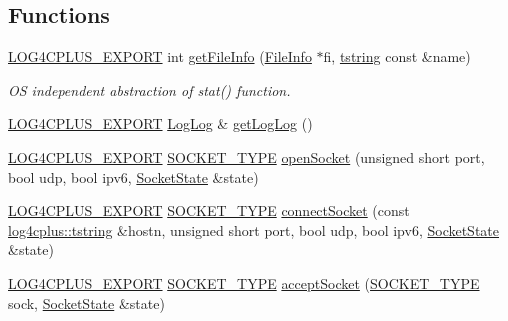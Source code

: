\subsection*{Functions}
\begin{DoxyCompactItemize}
\item 
\hyperlink{config_8hxx_ab13cb1a5317c245ee2ef4f2bfe0cfb2d}{L\-O\-G4\-C\-P\-L\-U\-S\-\_\-\-E\-X\-P\-O\-R\-T} int \hyperlink{namespacelog4cplus_1_1helpers_a4925e40c10820c28b753796a20a0b25e}{get\-File\-Info} (\hyperlink{structlog4cplus_1_1helpers_1_1FileInfo}{File\-Info} $\ast$fi, \hyperlink{namespacelog4cplus_a3c9287f6ebcddc50355e29d71152117b}{tstring} const \&name)
\begin{DoxyCompactList}\small\item\em O\-S independent abstraction of {\ttfamily stat()} function. \end{DoxyCompactList}\item 
\hyperlink{config_8hxx_ab13cb1a5317c245ee2ef4f2bfe0cfb2d}{L\-O\-G4\-C\-P\-L\-U\-S\-\_\-\-E\-X\-P\-O\-R\-T} \hyperlink{classlog4cplus_1_1helpers_1_1LogLog}{Log\-Log} \& \hyperlink{namespacelog4cplus_1_1helpers_ad330eb60c67283631cd16a0b45c9bfd9}{get\-Log\-Log} ()
\item 
\hyperlink{config_8hxx_ab13cb1a5317c245ee2ef4f2bfe0cfb2d}{L\-O\-G4\-C\-P\-L\-U\-S\-\_\-\-E\-X\-P\-O\-R\-T} \hyperlink{namespacelog4cplus_1_1helpers_afe2a1567866b6a9e0bfd5d425c3323f2}{S\-O\-C\-K\-E\-T\-\_\-\-T\-Y\-P\-E} \hyperlink{namespacelog4cplus_1_1helpers_ae1a347e14ce1f2daadf2817a1b7bed1f}{open\-Socket} (unsigned short port, bool udp, bool ipv6, \hyperlink{namespacelog4cplus_1_1helpers_ac57a089674b66ea982e43dff7ff1c78e}{Socket\-State} \&state)
\item 
\hyperlink{config_8hxx_ab13cb1a5317c245ee2ef4f2bfe0cfb2d}{L\-O\-G4\-C\-P\-L\-U\-S\-\_\-\-E\-X\-P\-O\-R\-T} \hyperlink{namespacelog4cplus_1_1helpers_afe2a1567866b6a9e0bfd5d425c3323f2}{S\-O\-C\-K\-E\-T\-\_\-\-T\-Y\-P\-E} \hyperlink{namespacelog4cplus_1_1helpers_aacb4b2ff893d5b89ecd10e6656123df3}{connect\-Socket} (const \hyperlink{namespacelog4cplus_a3c9287f6ebcddc50355e29d71152117b}{log4cplus\-::tstring} \&hostn, unsigned short port, bool udp, bool ipv6, \hyperlink{namespacelog4cplus_1_1helpers_ac57a089674b66ea982e43dff7ff1c78e}{Socket\-State} \&state)
\item 
\hyperlink{config_8hxx_ab13cb1a5317c245ee2ef4f2bfe0cfb2d}{L\-O\-G4\-C\-P\-L\-U\-S\-\_\-\-E\-X\-P\-O\-R\-T} \hyperlink{namespacelog4cplus_1_1helpers_afe2a1567866b6a9e0bfd5d425c3323f2}{S\-O\-C\-K\-E\-T\-\_\-\-T\-Y\-P\-E} \hyperlink{namespacelog4cplus_1_1helpers_a6446e750b6ca0bb0c56a5fded2b43ee1}{accept\-Socket} (\hyperlink{namespacelog4cplus_1_1helpers_afe2a1567866b6a9e0bfd5d425c3323f2}{S\-O\-C\-K\-E\-T\-\_\-\-T\-Y\-P\-E} sock, \hyperlink{namespacelog4cplus_1_1helpers_ac57a089674b66ea982e43dff7ff1c78e}{Socket\-State} \&state)

\end{DoxyCompactItemize}
